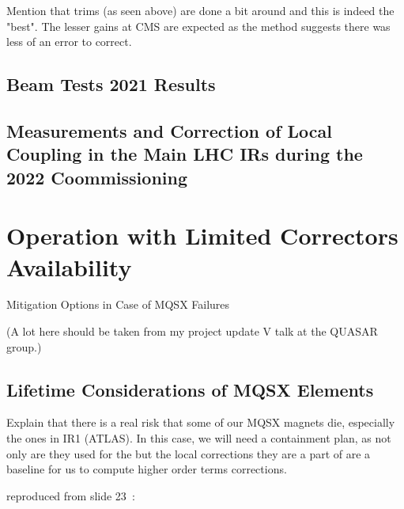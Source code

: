 Mention that trims (as seen above) are done a bit around and this is indeed the "best".
The lesser gains at CMS are expected as the method suggests there was less of an error to correct.

\subsection{Beam Tests \num{2021} Results}

\subsection{Measurements and Correction of Local Coupling in the Main LHC IRs during the \num{2022} Coommissioning}


\section{Operation with Limited Correctors Availability}

Mitigation Options in Case of MQSX Failures

(A lot here should be taken from my project update V talk at the QUASAR group.)

\subsection{Lifetime Considerations of MQSX Elements}

Explain that there is a real risk that some of our MQSX magnets die, especially the ones in IR1 (ATLAS).
In this case, we will need a containment plan, as not only are they used for the but the local corrections they are a part of are a baseline for us to compute higher order terms corrections.

 reproduced from slide 23~\cite{Evian21:Cerutti:TripletLifetime}:


